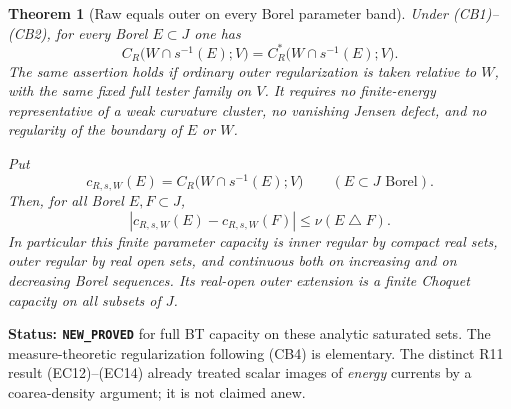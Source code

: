 \documentclass[11pt,a4paper]{article}
\numberwithin{equation}{section}
\newtheorem{theorem}{Theorem}[section]
\theoremstyle{definition}
\theoremstyle{remark}
\begin{document}
\begin{theorem}[Raw equals outer on every Borel parameter band]
\label{thm:r12-band-raw-outer-capacity}
Under (CB1)--(CB2), for every Borel $E\subset J$ one has
\[
 \boxed{\quad
 C_R\bigl(W\cap s^{-1}(E);V\bigr)
       =C_R^*\bigl(W\cap s^{-1}(E);V\bigr).
 \quad}
 \tag{CB7}
\]
The same assertion holds if ordinary outer regularization is
taken relative to $W$, with the same fixed full tester family
on $V$. It requires no finite-energy representative of a weak
curvature cluster, no vanishing Jensen defect, and no regularity
of the boundary of $E$ or $W$.

Put
\[
       c_{R,s,W}(E)=C_R\bigl(W\cap s^{-1}(E);V\bigr)
                                  \qquad(E\subset J\text{ Borel}).
 \tag{CB8}
\]
Then, for all Borel $E,F\subset J$,
\[
 |c_{R,s,W}(E)-c_{R,s,W}(F)|\leq\nu(E\mathbin\triangle F).
 \tag{CB9}
\]
In particular this finite parameter capacity is inner regular
by compact real sets, outer regular by real open sets, and
continuous both on increasing and on decreasing Borel sequences.
Its real-open outer extension is a finite Choquet capacity on
all subsets of $J$.
\end{theorem}

\noindent\textbf{Status: \texttt{NEW\_PROVED}} for full BT
capacity on these analytic saturated sets. The measure-theoretic
regularization following (CB4) is elementary. The distinct R11
result (EC12)--(EC14) already treated scalar images of \emph{energy}
currents by a coarea-density argument; it is not claimed anew.
\end{document}
